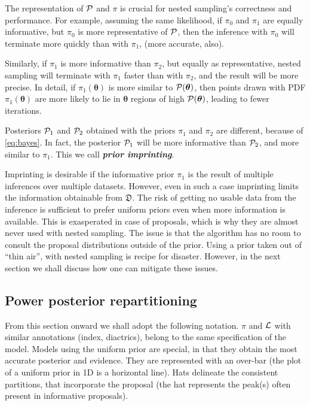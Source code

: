 \documentclass[usenatbib]{mnras}
\begin{document}
The representation of ${\cal P}$ and $\pi$ is crucial for nested
sampling's correctness and performance. For example, assuming the same
likelihood, if $\pi_{0}$ and $\pi_{1}$ are equally informative, but
$\pi_{0}$ is more representative of ${\cal P}$, then the inference
with $\pi_{0}$ will terminate more quickly than with $\pi_{1}$, (more
accurate, also).

Similarly, if $\pi_{1}$ is more informative than $\pi_{2}$, but
equally as representative, nested sampling will terminate with
$\pi_{1}$ faster than with $\pi_{2}$, and the result will be more
precise. In detail, if \(\pi_{1} (\bm{\theta})\) is more similar to
\( {\cal P} (\bm{\theta})\), then points drawn with PDF
\(\pi_{1} (\bm{\theta})\) are more likely to lie in $\bm{\theta}$
regions of high \( {\cal P} (\bm{\theta})\), leading to fewer
iterations.

Posteriors ${\cal P}_{1}$ and ${\cal P}_{2}$ obtained with the priors
$\pi_{1}$ and $\pi_{2}$ are different, because of \cref{eq:bayes}. In
fact, the posterior ${\cal P}_{1}$ will be more informative than
${\cal P}_{2}$, and more similar to $\pi_{1}$. This we call
\textbf{\emph{prior imprinting}}.


Imprinting is desirable if the informative prior $\pi_{1}$ is the
result of multiple inferences over multiple datasets. However, even in
such a case imprinting limits the information obtainable from
\(\mathfrak{D}\). The risk of getting no usable data from the
inference is sufficient to prefer uniform priors even when more
information is available. This is exasperated in case of proposals,
which is why they are almost never used with nested sampling. The
issue is that the algorithm has no room to consult the proposal
distributions outside of the prior. Using a prior taken out of ``thin
air'', with nested sampling is recipe for disaster. However, in the
next section we shall discuss how one can mitigate these issues.


\subsection{Power posterior repartitioning}\label{sec:autopr}
From this section onward we shall adopt the following notation. $\pi$
and ${\cal L}$ with similar annotations (index, diactrics), belong to
the same specification of the model. Models using the uniform prior
are special, in that they obtain the most accurate posterior and
evidence. They are represented with an over-bar (the plot of a uniform
prior in 1D is a horizontal line). Hats delineate the consistent
partitions, that incorporate the proposal (the hat represents the
peak(s) often present in informative proposals).
\end{document}
